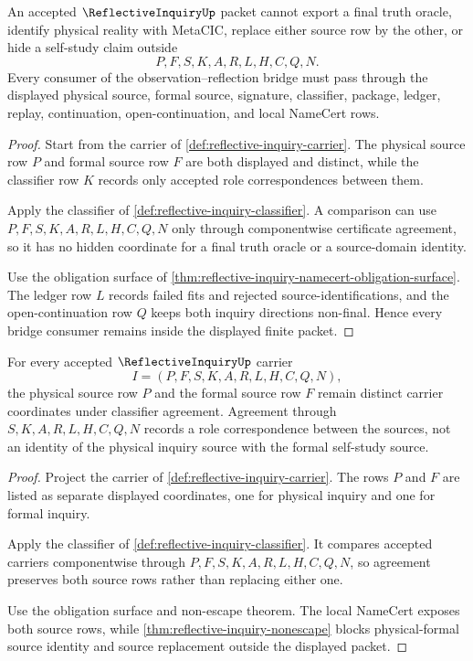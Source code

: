 \begin{theorem}
\label{thm:reflective-inquiry-nonescape}
An accepted $\ReflectiveInquiryUp$ packet cannot export a final truth oracle, identify physical reality with MetaCIC, replace either source row by the other, or hide a self-study claim outside
$$
P,F,S,K,A,R,L,H,C,Q,N.
$$
Every consumer of the observation--reflection bridge must pass through the displayed physical source, formal source, signature, classifier, package, ledger, replay, continuation, open-continuation, and local NameCert rows.
\end{theorem}
\begin{proof}
Start from the carrier of \autoref{def:reflective-inquiry-carrier}. The physical source row $P$ and formal source row $F$ are both displayed and distinct, while the classifier row $K$ records only accepted role correspondences between them.

Apply the classifier of \autoref{def:reflective-inquiry-classifier}. A comparison can use $P,F,S,K,A,R,L,H,C,Q,N$ only through componentwise certificate agreement, so it has no hidden coordinate for a final truth oracle or a source-domain identity.

Use the obligation surface of \autoref{thm:reflective-inquiry-namecert-obligation-surface}. The ledger row $L$ records failed fits and rejected source-identifications, and the open-continuation row $Q$ keeps both inquiry directions non-final. Hence every bridge consumer remains inside the displayed finite packet.
\end{proof}

\begin{theorem}
\label{thm:reflective-inquiry-source-separation}
For every accepted $\ReflectiveInquiryUp$ carrier
$$
I=(P,F,S,K,A,R,L,H,C,Q,N),
$$
the physical source row $P$ and the formal source row $F$ remain distinct carrier coordinates under classifier agreement. Agreement through $S,K,A,R,L,H,C,Q,N$ records a role correspondence between the sources, not an identity of the physical inquiry source with the formal self-study source.
\end{theorem}
\begin{proof}
Project the carrier of \autoref{def:reflective-inquiry-carrier}. The rows $P$ and $F$ are listed as separate displayed coordinates, one for physical inquiry and one for formal inquiry.

Apply the classifier of \autoref{def:reflective-inquiry-classifier}. It compares accepted carriers componentwise through $P,F,S,K,A,R,L,H,C,Q,N$, so agreement preserves both source rows rather than replacing either one.

Use the obligation surface and non-escape theorem. The local NameCert exposes both source rows, while \autoref{thm:reflective-inquiry-nonescape} blocks physical-formal source identity and source replacement outside the displayed packet.
\end{proof}

